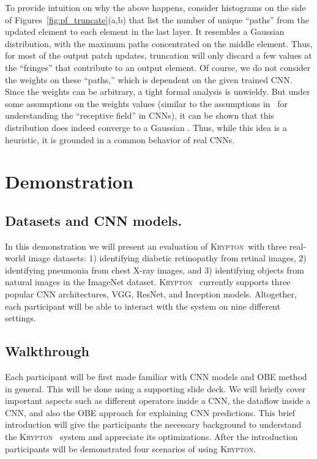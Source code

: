 \documentclass{vldb}
\newcommand{\system}{\textsc{Krypton}}
\begin{document}
To provide intuition on why the above happens, consider histograms on the side of Figures~\ref{fig:pf_truncate}(a,b) that list the number of unique ``paths'' from the updated element to each element in the last layer. It resembles a Gaussian distribution, with the maximum paths concentrated on the middle element. Thus, for most of the output patch updates, truncation will only discard a few values at the ``fringes'' that contribute to an output element. Of course, we do not consider the weights on these ``paths,'' which is dependent on the given trained CNN. Since the weights can be arbitrary, a tight formal analysis is unwieldy. But under some assumptions on the weights values (similar to the assumptions in~\cite{luo2016understanding} for understanding the ``receptive field'' in CNNs), it can be shown that this distribution does indeed converge to a Gaussian \cite{krypton}. Thus, while this idea is a heuristic, it is grounded in a common behavior of real CNNs.


\section{Demonstration}\label{demonstration}
\subsection{Datasets and CNN models.}
In this demonstration we will present an evaluation of \system ~with three real-world image datasets: 1) identifying diabetic retinopathy from retinal images, 2) identifying pneumonia from chest X-ray images, and 3) identifying objects from natural images in the ImageNet dataset.
\system~ currently supports three popular CNN architectures, VGG, ResNet, and Inception models. Altogether, each participant will be able to interact with the system on nine different settings.

\subsection{Walkthrough}
Each participant will be first made familiar with CNN models and OBE method in general.
This will be done using a supporting slide deck.
We will briefly cover important aspects such as different operators inside a CNN, the dataflow inside a CNN, and also the OBE approach for explaining CNN predictions.
This brief introduction will give the participants the necessary background to understand the \system~ system and appreciate its optimizations.
After the introduction participants will be demonstrated four scenarios of using \system.
\end{document}
